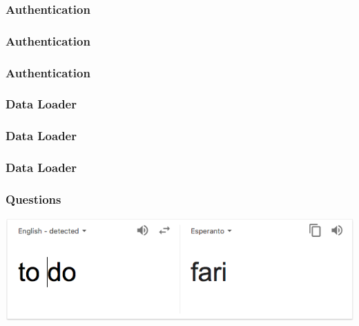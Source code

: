 \documentclass{beamer}
\begin{document}
\begin{frame}
\frametitle{Authentication}

\FunctionPlug
\end{frame}

\begin{frame}
\frametitle{Authentication}

\Auth
\end{frame}

\begin{frame}
\frametitle{Authentication}

\Mid
\end{frame}

\begin{frame}
\frametitle{Data Loader}
\SchemaDataLoader
\end{frame}


\begin{frame}
\frametitle{Data Loader}

\CoreDataLoader
\end{frame}

\begin{frame}
\frametitle{Data Loader}

\ObjectDataLoader
\end{frame}

\begin{frame}
\frametitle{Questions}
\includegraphics[width=1.0\textwidth]{fari}
\end{frame}
\end{document}
